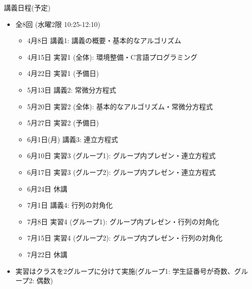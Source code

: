 \begin{frame}[t]{講義日程(予定)}
  \begin{itemize}
  \item 全8回 (水曜2限 10:25-12:10)
    \begin{itemize}
    \item 4月8日 講義1: 講義の概要・基本的なアルゴリズム
    \item 4月15日 実習1 (全体): 環境整備・C言語プログラミング
    \item 4月22日 実習1 (予備日)
    \item 5月13日 講義2: 常微分方程式
    \item 5月20日 実習2 (全体): 基本的なアルゴリズム・常微分方程式
    \item 5月27日 実習2 (予備日)
    \item 6月1日(月) 講義3: 連立方程式
    \item 6月10日 実習3 (グループ1): グループ内プレゼン・連立方程式
    \item 6月17日 実習3 (グループ2): グループ内プレゼン・連立方程式
    \item {\color{gray} 6月24日 休講}
    \item 7月1日 講義4: 行列の対角化
    \item 7月8日 実習4 (グループ1): グループ内プレゼン・行列の対角化
    \item 7月15日 実習4 (グループ2): グループ内プレゼン・行列の対角化
    \item {\color{gray} 7月22日 休講}
    \end{itemize}
  \item 実習はクラスを2グループに分けて実施(グループ1: 学生証番号が奇数、グループ2: 偶数)
  \end{itemize}
\end{frame}

